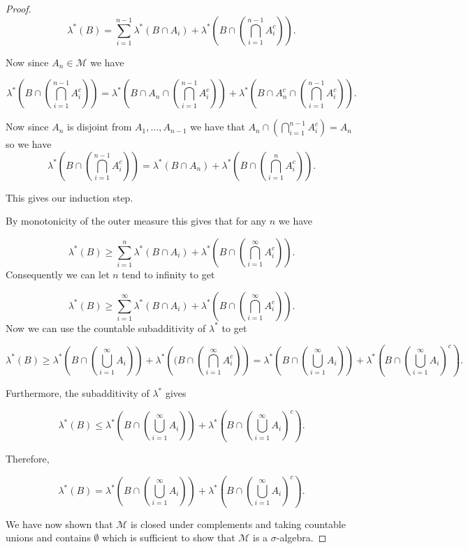 \documentclass[
]{book}
\theoremstyle{definition}
\theoremstyle{definition}
\theoremstyle{definition}
\theoremstyle{definition}
\theoremstyle{remark}
\begin{document}
\begin{proof}
\[ \lambda^*(B) = \sum_{i=1}^{n-1} \lambda^*(B \cap A_i) + \lambda^*\left( B \cap \left( \bigcap_{i=1}^{n-1} A_i^c \right) \right).  \]

Now since \(A_n \in \mathscr{M}\) we have

\[ \lambda^*\left( B \cap \left( \bigcap_{i=1}^{n-1} A_i^c \right) \right) = \lambda^* \left(B \cap A_n \cap \left( \bigcap_{i=1}^{n-1} A_i^c \right)  \right) + \lambda^* \left( B \cap A_n^c \cap \left( \bigcap_{i=1}^{n-1} A_i^c \right) \right).\]

Now since \(A_n\) is disjoint from \(A_1, \dots, A_{n-1}\) we have that \(A_n \cap \left( \bigcap_{i=1}^{n-1} A_i^c \right) = A_n\) so we have
\[  \lambda^*\left( B \cap \left( \bigcap_{i=1}^{n-1} A_i^c \right) \right) = \lambda^*(B \cap A_n) + \lambda^*\left( B \cap \left( \bigcap_{i=1}^{n} A_i^c \right) \right). \]

This gives our induction step.

By monotonicity of the outer measure this gives that for any \(n\) we have

\[ \lambda^*(B) \geq \sum_{i=1}^n \lambda^*(B \cap A_i) + \lambda^* \left(B \cap \left( \bigcap_{i=1}^\infty A_i^c \right) \right). \]
Consequently we can let \(n\) tend to infinity to get

\[ \lambda^*(B) \geq \sum_{i=1}^\infty \lambda^*(B \cap A_i) +\lambda^* \left(B \cap \left( \bigcap_{i=1}^\infty A_i^c \right) \right). \]
Now we can use the countable subadditivity of \(\lambda^*\) to get

\[ \lambda^*(B) \geq \lambda^*\left( B \cap \left( \bigcup_{i=1}^\infty A_i \right)\right) + \lambda^*\left((B \cap \left( \bigcap_{i=1}^\infty A_i^c \right) \right) = \lambda^* \left( B \cap \left( \bigcup_{i=1}^\infty A_i \right) \right) + \lambda^* \left( B \cap \left( \bigcup_{i=1}^\infty A_i \right)^c \right).\]

Furthermore, the subadditivity of \(\lambda^*\) gives

\[ \lambda^*(B) \leq  \lambda^* \left( B \cap \left( \bigcup_{i=1}^\infty A_i \right) \right) + \lambda^* \left( B \cap \left( \bigcup_{i=1}^\infty A_i \right)^c \right). \]

Therefore,

\[ \lambda^*(B) =  \lambda^* \left( B \cap \left( \bigcup_{i=1}^\infty A_i \right) \right) + \lambda^* \left( B \cap \left( \bigcup_{i=1}^\infty A_i \right)^c \right). \]

We have now shown that \(\mathscr{M}\) is closed under complements and taking countable unions and contains \(\emptyset\) which is sufficient to show that \(\mathscr{M}\) is a \(\sigma\)-algebra.
\end{proof}
\end{document}
